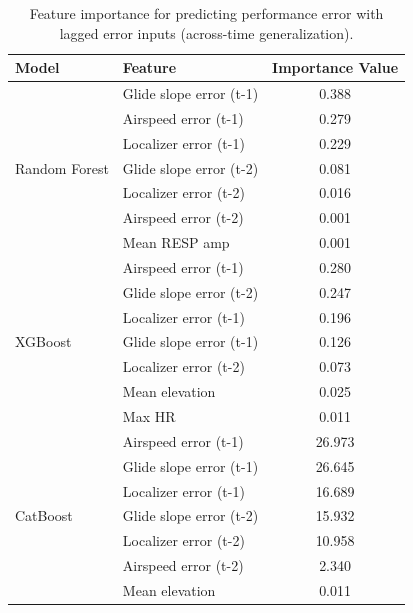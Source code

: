 \documentclass[11pt, a4paper]{article}
\begin{document}
\begin{table}[htbp]
	\caption{Feature importance for predicting performance error with lagged error inputs (across-time generalization).}
	\label{tab:feat-imp-temp-lag}
	\centering
	\small
	\begin{tabular}{llc}
		\toprule
		Model & Feature & Importance Value \\
		\midrule
		\multirow{7}{*}{Random Forest} &Glide slope error (t-1) &0.388\\
										&Airspeed error (t-1)  &0.279\\
										&Localizer error (t-1) &0.229\\
										&Glide slope error (t-2) &0.081\\
										&Localizer error (t-2)	&0.016\\
										&Airspeed error (t-2)  &0.001\\
										&Mean RESP amp			&0.001\\
		\midrule
		\multirow{7}{*}{XGBoost} 		&Airspeed error (t-1)		& 0.280\\
										&Glide slope error (t-2)	&0.247\\
										&Localizer error (t-1)		&0.196\\
										&Glide slope error (t-1)	&0.126\\
										&Localizer error (t-2)		&0.073\\
										&Mean elevation 			&0.025\\
										&Max HR						&0.011\\
		\midrule
		\multirow{7}{*}{CatBoost}		&Airspeed error (t-1)		&26.973\\
										&Glide slope error (t-1)	&26.645\\
										&Localizer error (t-1)		&16.689\\
										&Glide slope error (t-2)	&15.932\\
										&Localizer error (t-2)		&10.958\\
										&Airspeed error (t-2)		&2.340\\
										&Mean elevation 			&0.011\\
		\bottomrule
	\end{tabular}
\end{table}
\end{document}
